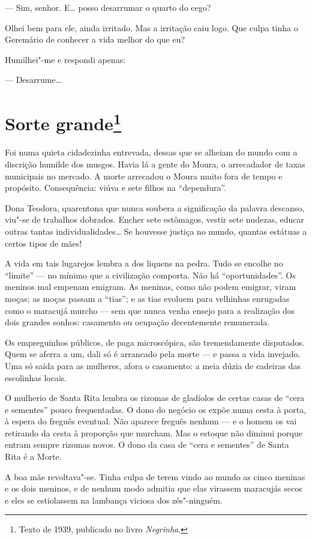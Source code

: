 --- Sim, senhor. E\ldots{} posso desarrumar o quarto do cego?

Olhei bem para ele, ainda irritado. Mas a irritação caiu logo. Que culpa
tinha o Geremário de conhecer a vida melhor do que eu?

Humilhei"-me e respondi apenas:

--- Desarrume\ldots{}

\chapter{Sorte grande\footnote[*]{Texto de 1939, publicado no livro \emph{Negrinha}.}}

Foi numa quieta cidadezinha entrevada, dessas que se alheiam do mundo
com a discrição humilde dos musgos. Havia lá a gente do Moura, o
arrecadador de taxas municipais no mercado. A morte arrecadou o Moura
muito fora de tempo e propósito. Consequência: viúva e sete filhos na
``dependura''.

Dona Teodora, quarentona que nunca soubera a significação da palavra
descanso, viu"-se de trabalhos dobrados. Encher sete estômagos, vestir
sete nudezas, educar outras tantas individualidades\ldots{} Se houvesse
justiça no mundo, quantas estátuas a certos tipos de mães!

A vida em tais lugarejos lembra a dos liquens na pedra. Tudo se encolhe
no ``limite'' --- no mínimo que a civilização comporta. Não há
``oportunidades''. Os meninos mal empenam emigram. As meninas, como não
podem emigrar, viram moças; as moças passam a ``tias''; e as tias
evoluem para velhinhas enrugadas como o maracujá murcho --- sem que
nunca venha ensejo para a realização dos dois grandes sonhos: casamento
ou ocupação decentemente remunerada.

Os empreguinhos públicos, de paga microscópica, são tremendamente
disputados. Quem se aferra a um, dali só é arrancado pela morte --- e
passa a vida invejado. Uma só saída para as mulheres, afora o casamento:
a meia dúzia de cadeiras das escolinhas locais.

O mulherio de Santa Rita lembra os rizomas de gladíolos de certas casas
de ``cera e sementes'' pouco frequentadas. O dono do negócio os expõe
numa cesta à porta, à espera do freguês eventual. Não aparece freguês
nenhum --- e o homem os vai retirando da cesta à proporção que murcham.
Mas o estoque não diminui porque entram sempre rizomas novos. O dono da
casa de ``cera e sementes'' de Santa Rita é a Morte.

A boa mãe revoltava"-se. Tinha culpa de terem vindo ao mundo as cinco
meninas e os dois meninos, e de nenhum modo admitia que elas virassem
maracujás secos e eles se estiolassem na lambança viciosa dos
zés"-ninguém.

